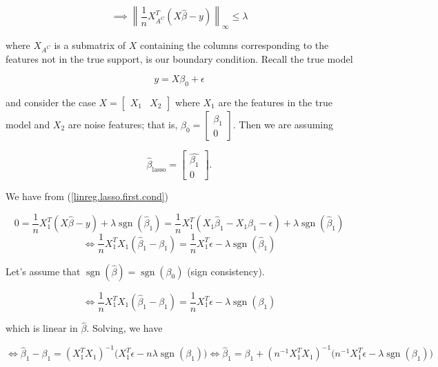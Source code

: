 \begin{equation}\label{linreg.lasso.bound.cond}
\implies \left\lVert \frac{1}{n} X_{A^C}^T (X \hat{\beta} - y) \right\rVert_\infty \leq \lambda
\end{equation}

where \(X_{A^C}\) is a submatrix of \(X\) containing the columns corresponding to the features not in the true support, is our boundary condition. Recall the true model

\[
y = X \beta_0 + \epsilon
\]

and consider the case \(X = \begin{bmatrix}X_1 & X_2 \end{bmatrix}\) where \(X_1\) are the features in the true model and \(X_2\) are noise features; that is, \(\beta_0 = \begin{bmatrix} \beta_1 \\ 0 \end{bmatrix}\). Then we are assuming

\[
\hat{\beta}_{\text{lasso}} = \begin{bmatrix} \hat{\beta_1} \\ 0 \end{bmatrix}.
\]

We have from (\ref{linreg.lasso.first.cond})

\[
0 = \frac{1}{n} X_1^T(X \hat{\beta} - y) + \lambda  \operatorname{sgn}(\hat{\beta}_1) = \frac{1}{n} X_1^T(X_1 \hat{\beta}_1 - X_1 \beta_1 - \epsilon) + \lambda  \operatorname{sgn}(\hat{\beta}_1) 
\]
\[
 \iff \frac{1}{n} X_1^TX_1 (\hat{\beta}_1 - \beta_1)  =  \frac{1}{n} X_1^T \epsilon - \lambda  \operatorname{sgn}(\hat{\beta}_1)
 \]
 
 Let's assume that \(\operatorname{sgn}(\hat{\beta}) = \operatorname{sgn}(\beta_0)\) (sign consistency).
 
 \[
  \iff \frac{1}{n} X_1^TX_1 (\hat{\beta}_1 - \beta_1)  =  \frac{1}{n} X_1^T \epsilon - \lambda  \operatorname{sgn}(\beta_1)
  \]
  
  which is linear in \(\hat{\beta}\). Solving, we have
  
\begin{equation}\label{linreg.lasso.first.cond.solved}
  \iff  \hat{\beta}_1 - \beta_1  =  ( X_1^TX_1)^{-1} \big( X_1^T \epsilon - n  \lambda  \operatorname{sgn}(\beta_1)\big)   \iff  \hat{\beta}_1   = \beta_1 +   ( n^{-1}X_1^TX_1)^{-1} \big( n^{-1} X_1^T \epsilon -   \lambda  \operatorname{sgn}(\beta_1) \big)
\end{equation}

